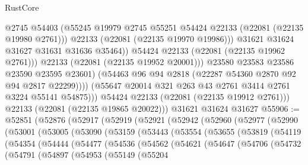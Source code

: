 \begin{lexlean}{RustCore}
\begin{coremodule}
                            @2745
                            @54403
                            (@55245
                              @19979
                              @2745
                              @55251
                              @54424
                              @22133
                              (@22081 (@22135 @19980 @2761)))
                            @22133
                            (@22081 (@22135 @19970 @19986)))
                          @31621
                          @31624
                          @31627
                          @31631
                          @31636
                          @35464))
                      @54424
                      @22133
                      (@22081 (@22135 @19962 @2761)))
                    @22133
                    (@22081 (@22135 @19952 @20001)))
                  @23580
                  @23583
                  @23586
                  @23590
                  @23595
                  @23601)
                (@54463 @96 @94 @2818 (@22287 @54360 @2870 @92 @94 @2817 @22299))))
            (@55647 @20014 @321 @263 @43 @2761 @3414 @2761 @3224 @55141 @54875)))
        @54424
        @22133
        (@22081 (@22135 @19912 @2761)))
      @22133
      (@22081 (@22135 @19865 @20022)))
    @31621
    @31624
    @31627
@55906 := @52851
    (@52876
      (@52917
        (@52919
          (@52921
            (@52942
              (@52960
                (@52977
                  (@52990
                    (@53001
                      (@53005
                        (@53090
                          (@53159
                            (@53443
                              (@53554
                                (@53655
                                  (@53819
                                    (@54119
                                      (@54354
                                        (@54444
                                          (@54477
                                            (@54536
                                              (@54562
                                                (@54621
                                                  (@54647
                                                    (@54706
                                                      (@54732
                                                        (@54791
                                                          (@54897
                                                            (@54953
                                                              (@55149
                                                                (@55204

\end{coremodule}
\end{lexlean}
